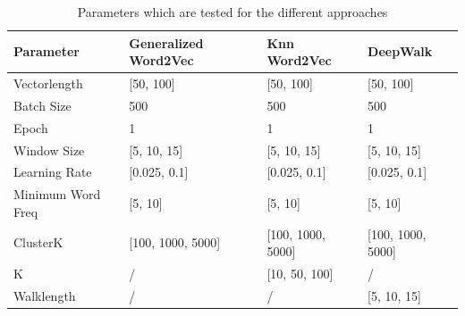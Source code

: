 \begin{table}[!htb]
\centering

\begin{tabular}{llll}
\hline
Parameter                                    & Generalized Word2Vec  & Knn Word2Vec          & DeepWalk              \\ \hline
\multicolumn{1}{l|}{Vectorlength}            & {[}50, 100{]}         & {[}50, 100{]}         & {[}50, 100{]}         \\
\multicolumn{1}{l|}{Batch Size}              & 500                   & 500                   & 500                   \\
\multicolumn{1}{l|}{Epoch}                   & 1                     & 1                     & 1                     \\
\multicolumn{1}{l|}{Window Size}             & {[}5, 10, 15{]}       & {[}5, 10, 15{]}       & {[}5, 10, 15{]}       \\
\multicolumn{1}{l|}{Learning Rate}           & {[}0.025, 0.1{]}      & {[}0.025, 0.1{]}      & {[}0.025, 0.1{]}      \\
\multicolumn{1}{l|}{Minimum Word Freq} & {[}5, 10{]}           & {[}5, 10{]}           & {[}5, 10{]}           \\
\multicolumn{1}{l|}{ClusterK}                & {[}100, 1000, 5000{]} & {[}100, 1000, 5000{]} & {[}100, 1000, 5000{]} \\
\multicolumn{1}{l|}{K}                       & /                     & {[}10, 50, 100{]}     & /                     \\
\multicolumn{1}{l|}{Walklength}              & /                     & /                     & {[}5, 10, 15{]}      
\end{tabular}

\caption{Parameters which are tested for the different approaches}
\label{tab:parameters}
\end{table}

